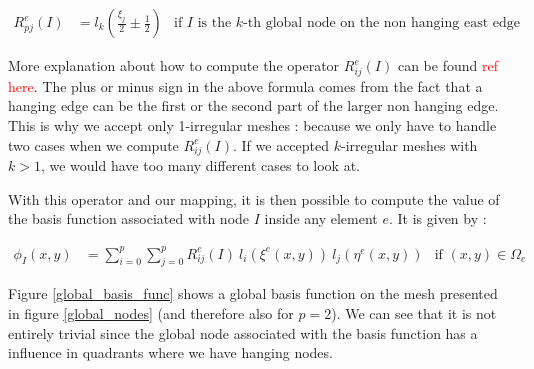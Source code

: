 \begin{align*}
R^e_{pj}(I) &= l_k \left(\frac{\xi_j}{2}\pm \frac{1}{2}\right) &\text{if $I$ is the $k$-th global node on the non hanging east edge}
\end{align*} 

More explanation about how to compute the operator $R^e_{ij}(I)$ can be found \textcolor{red}{ref here}. The plus or minus sign in the above formula comes from the fact that a hanging edge can be the first or the second part of the larger non hanging edge. This is why we accept only 1-irregular meshes : because we only have to handle two cases when we compute $R^e_{ij}(I)$. If we accepted $k$-irregular meshes with $k>1$, we would have too many different cases to look at. 

With this operator and our mapping, it is then possible to compute the value of the basis function associated with node $I$ inside any element $e$. It is given by : 

\begin{align}
\phi_I(x,y) &= \sum_{i=0}^p\sum_{j=0}^p R^e_{ij}(I) \: l_i(\xi^e(x,y))\: l_j(\eta^e(x,y)) &\text{if $(x,y) \in \Omega_e$}
\end{align}


Figure \ref{global_basis_func} shows a global basis function on the mesh presented in figure \ref{global_nodes} (and therefore also for $p=2$). We can see that it is not entirely trivial since the global node associated with the basis function has a influence in quadrants where we have hanging nodes.





